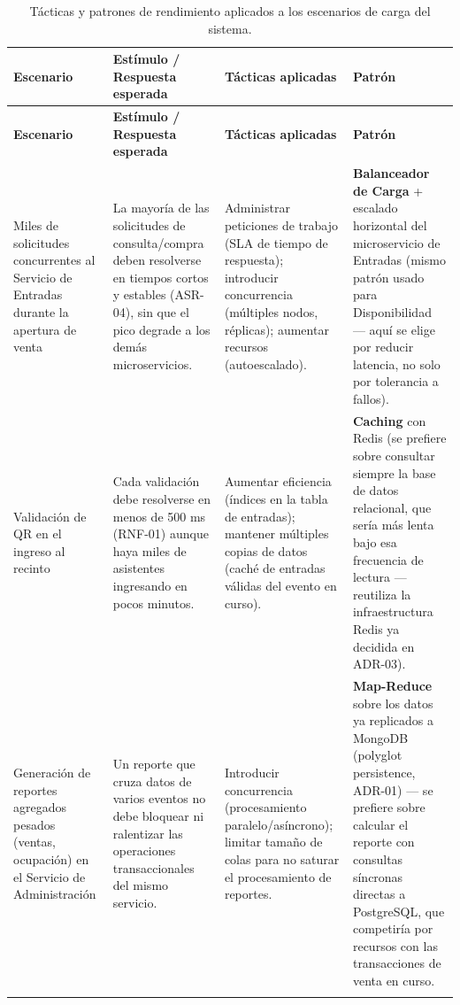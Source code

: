 \documentclass[12pt,a4paper]{article}
\begin{document}
\begin{center}
\begin{longtable}{p{2.6cm}p{4.7cm}p{3.6cm}p{2.9cm}}
\toprule
\textbf{Escenario} & \textbf{Estímulo / Respuesta esperada} & \textbf{Tácticas aplicadas} & \textbf{Patrón}\\
\midrule
\endfirsthead
\toprule
\textbf{Escenario} & \textbf{Estímulo / Respuesta esperada} & \textbf{Tácticas aplicadas} & \textbf{Patrón}\\
\midrule
\endhead
Miles de solicitudes concurrentes al Servicio de Entradas durante la apertura de venta &
La mayoría de las solicitudes de consulta/compra deben resolverse en tiempos cortos y estables
(ASR-04), sin que el pico degrade a los demás microservicios. &
Administrar peticiones de trabajo (SLA de tiempo de respuesta); introducir concurrencia (múltiples
nodos, réplicas); aumentar recursos (autoescalado). &
\textbf{Balanceador de Carga} + escalado horizontal del microservicio de Entradas (mismo patrón
usado para Disponibilidad — aquí se elige por reducir latencia, no solo por tolerancia a fallos).\\[0.5em]

Validación de QR en el ingreso al recinto &
Cada validación debe resolverse en menos de 500 ms (RNF-01) aunque haya miles de asistentes
ingresando en pocos minutos. &
Aumentar eficiencia (índices en la tabla de entradas); mantener múltiples copias de datos
(caché de entradas válidas del evento en curso). &
\textbf{Caching} con Redis (se prefiere sobre consultar siempre la base de datos relacional,
que sería más lenta bajo esa frecuencia de lectura — reutiliza la infraestructura Redis ya
decidida en ADR-03).\\[0.5em]

Generación de reportes agregados pesados (ventas, ocupación) en el Servicio de Administración &
Un reporte que cruza datos de varios eventos no debe bloquear ni ralentizar las operaciones
transaccionales del mismo servicio. &
Introducir concurrencia (procesamiento paralelo/asíncrono); limitar tamaño de colas para no
saturar el procesamiento de reportes. &
\textbf{Map-Reduce} sobre los datos ya replicados a MongoDB (polyglot persistence, ADR-01) —
se prefiere sobre calcular el reporte con consultas síncronas directas a PostgreSQL, que
competiría por recursos con las transacciones de venta en curso.\\
\bottomrule
\caption{Tácticas y patrones de rendimiento aplicados a los escenarios de carga del sistema.}
\label{tab:tacticas-rendimiento}
\end{longtable}
\end{center}
\end{document}
